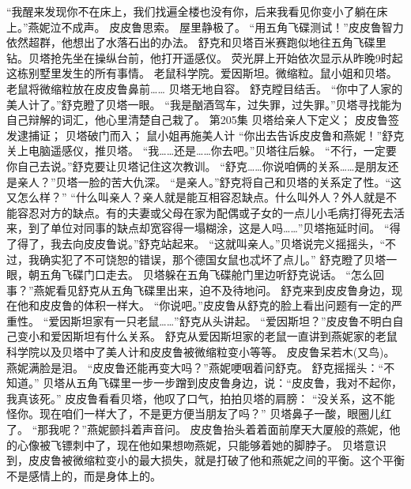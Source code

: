 \documentclass[a4paper,12pt,UTF8,twoside]{ctexbook}
\begin{document}
        “我醒来发现你不在床上，我们找遍全楼也没有你，后来我看见你变小了躺在床上。”燕妮泣不成声。  
        皮皮鲁思索。  
        屋里静极了。  
        “用五角飞碟测试！”皮皮鲁智力依然超群，他想出了水落石出的办法。  
        舒克和贝塔百米赛跑似地往五角飞碟里钻。贝塔抢先坐在操纵台前，他打开遥感仪。  
        荧光屏上开始依次显示从昨晚9时起这栋别墅里发生的所有事情。  
        老鼠科学院。爱因斯坦。微缩粒。鼠小姐和贝塔。老鼠将微缩粒放在皮皮鲁鼻前……  
        贝塔无地自容。  
        舒克瞠目结舌。  
        “你中了人家的美人计了。”舒克瞪了贝塔一眼。  
        “我是酗酒驾车，过失罪，过失罪。”贝塔寻找能为自己辩解的词汇，他心里清楚自己栽了。          第205集  
        贝塔给亲人下定义；  
        皮皮鲁签发逮捕证；  
        贝塔破门而入；  
        鼠小姐再施美人计    
        “你出去告诉皮皮鲁和燕妮！”舒克关上电脑遥感仪，推贝塔。  
        “我……还是……你去吧。”贝塔往后躲。  
        “不行，一定要你自己去说。”舒克要让贝塔记住这次教训。  
        “舒克……你说咱俩的关系……是朋友还是亲人？”贝塔一脸的苦大仇深。  
        “是亲人。”舒克将自己和贝塔的关系定了性。“这又怎么样？”  
        “什么叫亲人？亲人就是能互相容忍缺点。什么叫外人？外人就是不能容忍对方的缺点。有的夫妻或父母在家为配偶或子女的一点儿小毛病打得死去活来，到了单位对同事的缺点却宽容得一塌糊涂，这是人吗……”贝塔拖延时间。  
        “得了得了，我去向皮皮鲁说。”舒克站起来。  
        “这就叫亲人。”贝塔说完义摇摇头，“不过，我确实犯了不可饶恕的错误，那个德国女鼠也忒坏了点儿。”  
        舒克瞪了贝塔一眼，朝五角飞碟门口走去。  
        贝塔躲在五角飞碟舱门里边听舒克说话。  
        “怎么回事？”燕妮看见舒克从五角飞碟里出来，迫不及待地问。  
        舒克来到皮皮鲁身边，现在他和皮皮鲁的体积一样大。  
        “你说吧。”皮皮鲁从舒克的脸上看出问题有一定的严重性。  
        “爱因斯坦家有一只老鼠……”舒克从头讲起。  
        “爱因斯坦？”皮皮鲁不明白自己变小和爱因斯坦有什么关系。  
        舒克从爱因斯坦家的老鼠一直讲到燕妮家的老鼠科学院以及贝塔中了美人计和皮皮鲁被微缩粒变小等等。  
        皮皮鲁呆若木(又鸟)。  
        燕妮满脸是泪。  
        “皮皮鲁还能再变大吗？”燕妮哽咽着问舒克。        
        舒克摇摇头：“不知道。”  
        贝塔从五角飞碟里一步一步蹭到皮皮鲁身边，说：“皮皮鲁，我对不起你，我真该死。”  
        皮皮鲁看看贝塔，他叹了口气，拍拍贝塔的肩膀：  
        “没关系，这不能怪你。现在咱们一样大了，不是更方便当朋友了吗？”  
        贝塔鼻子一酸，眼圈儿红了。  
        “那我呢？”燕妮颤抖着声音问。  
        皮皮鲁抬头着着面前摩天大厦般的燕妮，他的心像被飞镖刺中了，现在他如果想吻燕妮，只能够着她的脚脖子。  
        贝塔意识到，皮皮鲁被微缩粒变小的最大损失，就是打破了他和燕妮之间的平衡。这个平衡不是感情上的，而是身体上的。  
\end{document}

